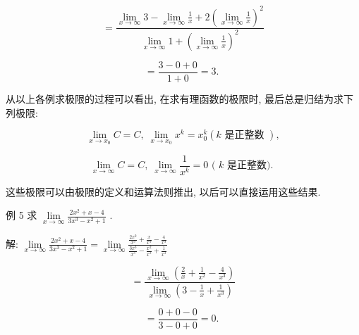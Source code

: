 \documentclass[lang=cn,newtx,10pt,scheme=chinese]{elegantbook}
\begin{document}
\[
= \frac{\mathop{\lim }\limits_{{x \rightarrow \infty }}3 - \mathop{\lim }\limits_{{x \rightarrow \infty }}\frac{1}{x} + 2{\left( \mathop{\lim }\limits_{{x \rightarrow \infty }}\frac{1}{x}\right) }^{2}}{\mathop{\lim }\limits_{{x \rightarrow \infty }}1 + {\left( \mathop{\lim }\limits_{{x \rightarrow \infty }}\frac{1}{x}\right) }^{2}}
\]

\[
= \frac{3 - 0 + 0}{1 + 0} = 3\text{. }
\]

从以上各例求极限的过程可以看出, 在求有理函数的极限时, 最后总是归结为求下列极限:

\[
\mathop{\lim }\limits_{{x \rightarrow {x}_{0}}}C = C,\;\mathop{\lim }\limits_{{x \rightarrow {x}_{0}}}{x}^{k} = {x}_{0}^{k}\left( {k\text{ 是正整数 }}\right) ,
\]

\[
\mathop{\lim }\limits_{{x \rightarrow \infty }}C = C,\;\mathop{\lim }\limits_{{x \rightarrow \infty }}\frac{1}{{x}^{k}} = 0\text{ ( }k\text{ 是正整数). }
\]

这些极限可以由极限的定义和运算法则推出, 以后可以直接运用这些结果.

例 5 求 \(\mathop{\lim }\limits_{{x \rightarrow \infty }}\frac{2{x}^{2} + x - 4}{3{x}^{3} - {x}^{2} + 1}\) .

解: \(\mathop{\lim }\limits_{{x \rightarrow \infty }}\frac{2{x}^{2} + x - 4}{3{x}^{3} - {x}^{2} + 1} = \mathop{\lim }\limits_{{x \rightarrow \infty }}\frac{\frac{2{x}^{2}}{{x}^{3}} + \frac{x}{{x}^{3}} - \frac{4}{{x}^{3}}}{\frac{3{x}^{3}}{{x}^{3}} - \frac{{x}^{2}}{{x}^{3}} + \frac{1}{{x}^{3}}}\)

\[
= \frac{\mathop{\lim }\limits_{{x \rightarrow \infty }}\left( {\frac{2}{x} + \frac{1}{{x}^{2}} - \frac{4}{{x}^{3}}}\right) }{\mathop{\lim }\limits_{{x \rightarrow \infty }}\left( {3 - \frac{1}{x} + \frac{1}{{x}^{3}}}\right) }
\]

\[
= \frac{0 + 0 - 0}{3 - 0 + 0} = 0\text{. }
\]
\end{document}
